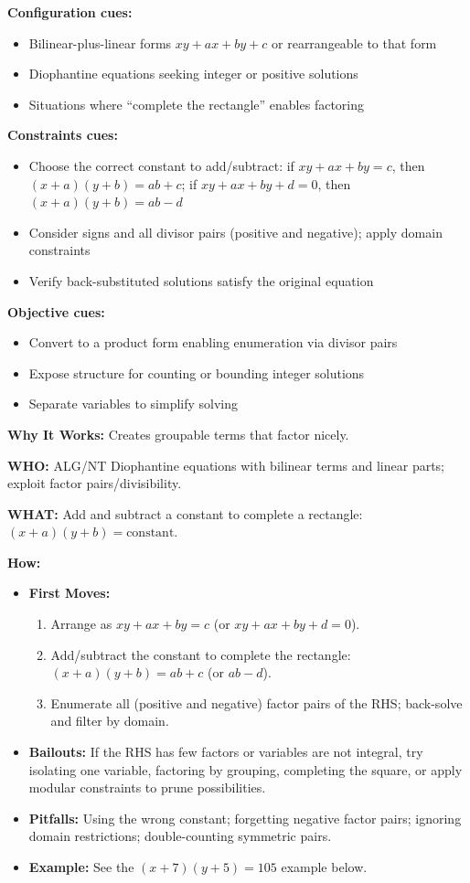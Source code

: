\documentclass[12pt]{article}
\begin{document}
\textbf{Configuration cues:}
\begin{itemize}
    \item Bilinear-plus-linear forms \(xy + ax + by + c\) or rearrangeable to that form
    \item Diophantine equations seeking integer or positive solutions
    \item Situations where ``complete the rectangle'' enables factoring
\end{itemize}

\textbf{Constraints cues:}
\begin{itemize}
    \item Choose the correct constant to add/subtract: if \(xy+ax+by=c\), then \((x+a)(y+b)=ab+c\); if \(xy+ax+by+d=0\), then \((x+a)(y+b)=ab-d\)
    \item Consider signs and all divisor pairs (positive and negative); apply domain constraints
    \item Verify back-substituted solutions satisfy the original equation
\end{itemize}

\textbf{Objective cues:}
\begin{itemize}
    \item Convert to a product form enabling enumeration via divisor pairs
    \item Expose structure for counting or bounding integer solutions
    \item Separate variables to simplify solving
\end{itemize}

\textbf{Why It Works:} Creates groupable terms that factor nicely.

\textbf{WHO:} ALG/NT Diophantine equations with bilinear terms and linear parts; exploit factor pairs/divisibility.

\textbf{WHAT:} Add and subtract a constant to complete a rectangle: \((x+a)(y+b)=\text{constant}\).

\textbf{How:}
\begin{itemize}
    \item \textbf{First Moves:}
    \begin{enumerate}[nosep]
        \item Arrange as $xy+ax+by=c$ (or $xy+ax+by+d=0$).
        \item Add/subtract the constant to complete the rectangle: $(x+a)(y+b)=ab+c$ (or $ab-d$).
        \item Enumerate all (positive and negative) factor pairs of the RHS; back-solve and filter by domain.
    \end{enumerate}
    \item \textbf{Bailouts:} If the RHS has few factors or variables are not integral, try isolating one variable, factoring by grouping, completing the square, or apply modular constraints to prune possibilities.
    \item \textbf{Pitfalls:} Using the wrong constant; forgetting negative factor pairs; ignoring domain restrictions; double-counting symmetric pairs.
    \item \textbf{Example:} See the $(x+7)(y+5)=105$ example below.
\end{itemize}
\end{document}
